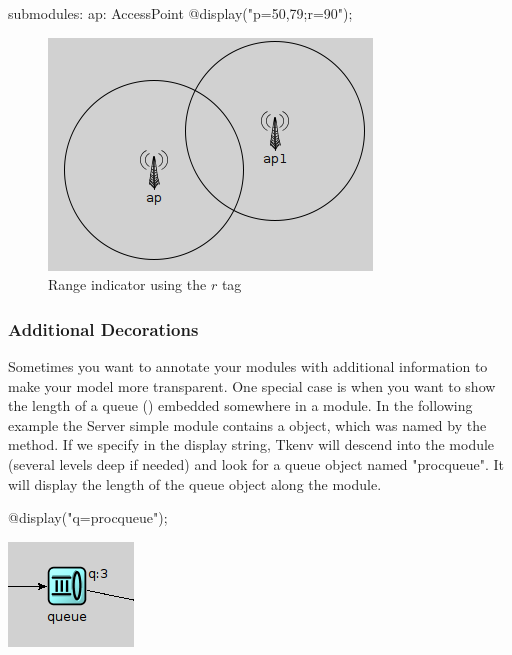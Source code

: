 \begin{ned}
submodules:
    ap: AccessPoint {
        @display("p=50,79;r=90");
    }
\end{ned}

\begin{figure}[htbp]
  \begin{center}
    \includegraphics{figures/graphics-rtag}
    \caption{Range indicator using the $r$ tag}
    \label{fig:graphics-rtag}
  \end{center}
\end{figure}

\subsubsection{Additional Decorations}
Sometimes you want to annotate your modules with additional information
to make your model more transparent. One special case is when you want to
show the length of a queue () embedded somewhere in a module.
In the following example the Server simple module contains a  object,
which was named by the  method.
If we specify  in the display string, Tkenv will descend into
the module (several levels deep if needed) and look for a queue object
named "procqueue". It will display the length of the queue object along the module.

\begin{ned}
@display("q=procqueue");
\end{ned}

\begin{center}
\includegraphics{figures/graphics-qtag}
\end{center}

